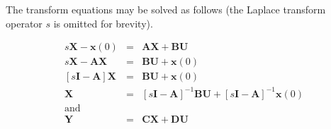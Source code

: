 The transform equations may be solved as follows (the Laplace
transform operator $s$ is omitted for brevity).

\begin{eqnarray}
 s\mathbf{X}-\mathbf{x}(0) &=&
  \mathbf{A}\mathbf{X}+\mathbf{B}\mathbf{U}\nonumber\\
 s\mathbf{X}-\mathbf{A}\mathbf{X} &=&
  \mathbf{B}\mathbf{U}+\mathbf{x}(0)\nonumber\\
 \left[s\mathbf{I}-\mathbf{A}\right]\mathbf{X} &=&
  \mathbf{B}\mathbf{U}+\mathbf{x}(0)\nonumber\\
 \mathbf{X} &=&
  \left[s\mathbf{I}-\mathbf{A}\right]^{-1}\mathbf{B}\mathbf{U}+
  \left[s\mathbf{I}-\mathbf{A}\right]^{-1}\mathbf{x}(0)\label{eqn:def-of-x}\\
  \mathrm{and}\nonumber \\
  \mathbf{Y}&=& \mathbf{C}\mathbf{X}+\mathbf{D}\mathbf{U}\label{eqn:def-of-y}
\end{eqnarray}

\endinput


